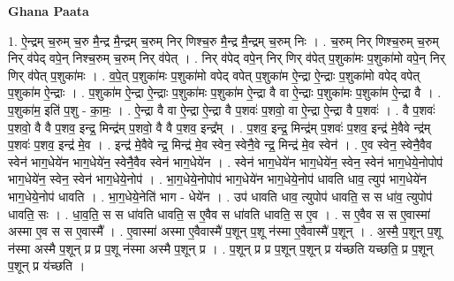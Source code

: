 \documentclass[17pt]{extarticle}
\begin{document}
\textbf{Ghana Paata } \newline

1. ऐ॒न्द्रम् च॒रुम् च॒रु मै॒न्द्र मै॒न्द्रम् च॒रुम् निर् णिश्च॒रु मै॒न्द्र मै॒न्द्रम् च॒रुम् निः । . च॒रुम् निर् णिश्च॒रुम् च॒रुम् निर् व॑पेद् वपे॒न् निश्च॒रुम् च॒रुम् निर् व॑पेत् । . निर् व॑पेद् वपे॒न् निर् णिर् व॑पेत् प॒शुका॑मः प॒शुका॑मो वपे॒न् निर् णिर् व॑पेत् प॒शुका॑मः । . व॒पे॒त् प॒शुका॑मः प॒शुका॑मो वपेद् वपेत् प॒शुका॑म ऐ॒न्द्रा ऐ॒न्द्राः प॒शुका॑मो वपेद् वपेत् प॒शुका॑म ऐ॒न्द्राः । . प॒शुका॑म ऐ॒न्द्रा ऐ॒न्द्राः प॒शुका॑मः प॒शुका॑म ऐ॒न्द्रा वै वा ऐ॒न्द्राः प॒शुका॑मः प॒शुका॑म ऐ॒न्द्रा वै । . प॒शुका॑म॒ इति॑ प॒शु - का॒मः॒ । . ऐ॒न्द्रा वै वा ऐ॒न्द्रा ऐ॒न्द्रा वै प॒शवः॑ प॒शवो॒ वा ऐ॒न्द्रा ऐ॒न्द्रा वै प॒शवः॑ । . वै प॒शवः॑ प॒शवो॒ वै वै प॒शव॒ इन्द्र॒ मिन्द्र॑म् प॒शवो॒ वै वै प॒शव॒ इन्द्र᳚म् । . प॒शव॒ इन्द्र॒ मिन्द्र॑म् प॒शवः॑ प॒शव॒ इन्द्र॑ मे॒वैवे न्द्र॑म् प॒शवः॑ प॒शव॒ इन्द्र॑ मे॒व । . इन्द्र॑ मे॒वैवे न्द्र॒ मिन्द्र॑ मे॒व स्वेन॒ स्वेनै॒वे न्द्र॒ मिन्द्र॑ मे॒व स्वेन॑ । . ए॒व स्वेन॒ स्वेनै॒वैव स्वेन॑ भाग॒धेये॑न भाग॒धेये॑न॒ स्वेनै॒वैव स्वेन॑ भाग॒धेये॑न । . स्वेन॑ भाग॒धेये॑न भाग॒धेये॑न॒ स्वेन॒ स्वेन॑ भाग॒धेये॒नोपोप॑ भाग॒धेये॑न॒ स्वेन॒ स्वेन॑ भाग॒धेये॒नोप॑ । . भा॒ग॒धेये॒नोपोप॑ भाग॒धेये॑न भाग॒धेये॒नोप॑ धावति धाव॒ त्युप॑ भाग॒धेये॑न भाग॒धेये॒नोप॑ धावति । . भा॒ग॒धेये॒नेति॑ भाग - धेये॑न । . उप॑ धावति धाव॒ त्युपोप॑ धावति॒ स स धा॑व॒ त्युपोप॑ धावति॒ सः । . धा॒व॒ति॒ स स धा॑वति धावति॒ स ए॒वैव स धा॑वति धावति॒ स ए॒व । . स ए॒वैव स स ए॒वास्मा॑ अस्मा ए॒व स स ए॒वास्मै᳚ । . ए॒वास्मा॑ अस्मा ए॒वैवास्मै॑ प॒शून् प॒शू न॑स्मा ए॒वैवास्मै॑ प॒शून् । . अ॒स्मै॒ प॒शून् प॒शू न॑स्मा अस्मै प॒शून् प्र प्र प॒शू न॑स्मा अस्मै प॒शून् प्र । . प॒शून् प्र प्र प॒शून् प॒शून् प्र य॑च्छति यच्छति॒ प्र प॒शून् प॒शून् प्र य॑च्छति । \newline
\end{document}
